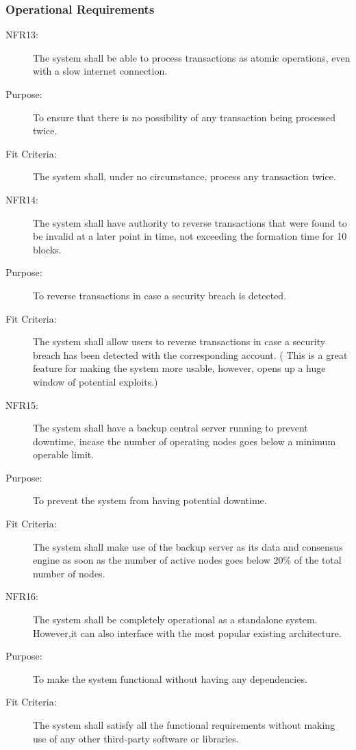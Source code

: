 \documentclass[a4paper,twoside,phd]{BYUPhys}
\begin{document}
\subsubsection{Operational Requirements}
\begin{description}
\item[NFR13:] The  system  shall  be  able  to  process  transactions  as  atomic  operations,  even with a slow internet connection.
\item[Purpose:] To ensure that there is no possibility of any transaction being processed twice.
\item[Fit Criteria:] The system shall, under no circumstance, process any transaction twice.
\item[NFR14:] The system shall have authority to reverse transactions that were found to be invalid at a later point in time, not exceeding the formation time for 10 blocks.
\item[Purpose:] To reverse transactions in case a security breach is detected.
\item[Fit Criteria:] The system shall allow users to reverse transactions in case a security breach has been detected with the corresponding account. ( This is a great feature for making the system more usable, however, opens up a huge window of potential exploits.)
\item[NFR15:] The system shall have a backup central server running to prevent downtime, incase the number of operating nodes goes below a minimum operable limit.
\item[Purpose:] To prevent the system from having potential downtime.
\item[Fit Criteria:] The system shall make use of the backup server as its data and consensus engine as soon as the number of active nodes goes below 20\% of the total number of nodes.
\item[NFR16:] The system shall be completely operational as a standalone system.  However,it can also interface with the most popular existing architecture.
\item[Purpose:] To make the system functional without having any dependencies.
\item[Fit Criteria:] The system shall satisfy all the functional requirements without making use of any other third-party software or libraries.
\end{description}
\end{document}

